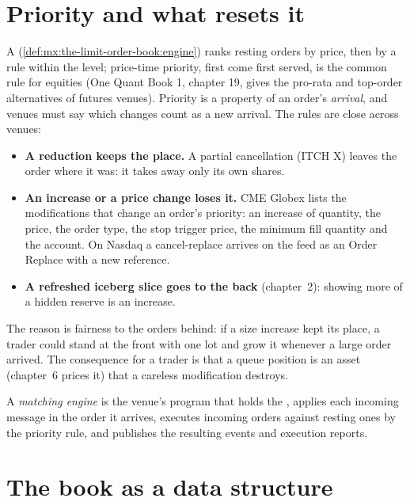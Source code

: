 \section{Priority and what resets it}

A  (\cref{def:mx:the-limit-order-book:engine}) ranks resting orders by price, then by a rule within the level; price-time priority,
first come first served, is the common rule for equities (One Quant Book 1, chapter 19, gives the pro-rata and top-order alternatives of futures
venues). Priority is a property of an order's \emph{arrival}, and venues must say which changes count as a new arrival. The rules are close
across venues:
\begin{itemize}
\item \textbf{A reduction keeps the place.} A partial cancellation (ITCH X) leaves the order where it was: it takes away only its own shares.
\item \textbf{An increase or a price change loses it.} CME Globex lists the modifications that change an order's priority: an increase of quantity,
the price, the order type, the stop trigger price, the minimum fill quantity and the account. On Nasdaq a cancel-replace arrives on the feed as
an Order Replace with a new reference.
\item \textbf{A refreshed iceberg slice goes to the back} (chapter~2): showing more of a hidden reserve is an increase.
\end{itemize}
The reason is fairness to the orders behind: if a size increase kept its place, a trader could stand at the front with one lot and grow it
whenever a large order arrived. The consequence for a trader is that a queue position is an asset (chapter~6 prices it) that a careless
modification destroys.

\begin{definition}\label{def:mx:the-limit-order-book:engine}
A \emph{matching engine} is the venue's program that holds the , applies each incoming message in the
order it arrives, executes incoming orders against resting ones by the priority rule, and publishes the resulting events and execution reports.
\end{definition}

\section{The book as a data structure}

